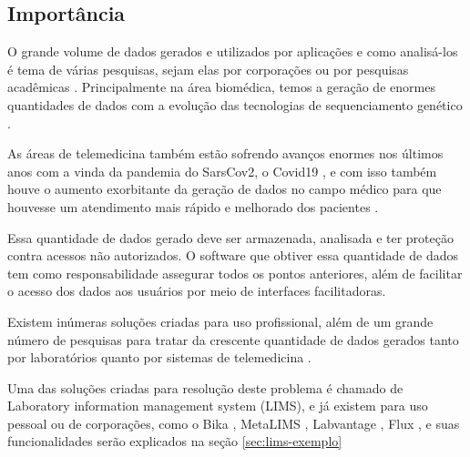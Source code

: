 \subsection{Importância}


O grande volume de dados gerados e utilizados por aplicações e como analisá-los é tema de várias pesquisas, sejam elas por corporações ou por pesquisas acadêmicas \R. Principalmente na área biomédica, temos a geração de enormes quantidades de dados com a evolução das tecnologias de sequenciamento genético \cite{luoJ2016}.

As áreas de telemedicina também estão sofrendo avanços enormes nos últimos anos com a vinda da pandemia do SarsCov2, o Covid19 \cite{bakhtiar2020, kronenfeld2021, GatesB.Colbert2020UtilityEra}, e com isso também houve o aumento exorbitante da geração de dados no campo médico para que houvesse um atendimento mais rápido e melhorado dos pacientes \cite{MohdKhanapiAbdGhani2018PDFData, Coakley2015TransformingAnalytics}.

Essa quantidade de dados gerado deve ser armazenada, analisada e ter proteção contra acessos não autorizados. O software que obtiver essa quantidade de dados tem como responsabilidade assegurar todos os pontos anteriores, além de facilitar o acesso dos dados aos usuários por meio de interfaces facilitadoras.

Existem inúmeras soluções criadas para uso profissional, além de um grande número de pesquisas para tratar da crescente quantidade de dados gerados tanto por laboratórios quanto por sistemas de telemedicina \cite{Mangrulkar2022AutomaticTechniques}.

Uma das soluções criadas para resolução deste problema é chamado de Laboratory information management system (LIMS), e já existem para uso pessoal ou de corporações, como o Bika \cite{Goodblatt2006FosteringProcess}, MetaLIMS \cite{Heinle2017MetaLIMSLabs}, Labvantage \cite{Smallmon2017BiobankingSilos}, Flux \cite{Melo2010SIGLa:Laboratories}, e suas funcionalidades serão explicados na seção \ref{sec:lims-exemplo}


